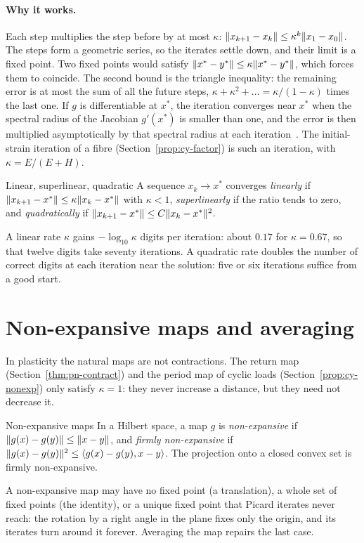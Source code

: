 \paragraph{Why it works.} Each step multiplies the step before by at most $\kappa$:
$\lVert x_{k+1}-x_k\rVert\le\kappa^k\lVert x_1-x_0\rVert$. The steps form a geometric
series, so the iterates settle down, and their limit is a fixed point. Two
fixed points would satisfy $\lVert x^\ast-y^\ast\rVert\le\kappa\lVert x^\ast-y^\ast\rVert$,
which forces them to coincide. The second bound is the triangle inequality:
the remaining error is at most the sum of all the future steps,
$\kappa+\kappa^2+\dots=\kappa/(1-\kappa)$ times the last one.
If $g$ is differentiable at $x^\ast$, the iteration converges near $x^\ast$
when the spectral radius of the Jacobian $g'(x^\ast)$ is smaller than one, and
the error is then multiplied asymptotically by that spectral radius at each
iteration~\cite[Ch.~10]{OrtegaRheinboldt1970}. The initial-strain iteration
of a fibre (Section~\ref{prop:cy-factor}) is such an iteration, with
$\kappa=E/(E+H)$.

\begin{gbox}{Linear, superlinear, quadratic}\label{def:it-order}
%
A sequence $x_k\to x^\ast$ converges \emph{linearly} if
$\lVert x_{k+1}-x^\ast\rVert\le\kappa\lVert x_k-x^\ast\rVert$ with $\kappa<1$,
\emph{superlinearly} if the ratio tends to zero, and \emph{quadratically} if
$\lVert x_{k+1}-x^\ast\rVert\le C\lVert x_k-x^\ast\rVert^2$.
\end{gbox}
A linear rate $\kappa$ gains $-\log_{10}\kappa$ digits per iteration: about
$0.17$ for $\kappa=0.67$, so that twelve digits take seventy iterations. A
quadratic rate doubles the number of correct digits at each iteration near the
solution: five or six iterations suffice from a good start.

\section{Non-expansive maps and averaging}\label{sec:it-nonexp}
%
In plasticity the natural maps are not contractions. The return map
(Section~\ref{thm:pn-contract}) and the period map of cyclic loads
(Section~\ref{prop:cy-nonexp}) only satisfy $\kappa=1$: they never increase a
distance, but they need not decrease it.
\begin{gbox}{Non-expansive maps}\label{def:it-nonexp}
In a Hilbert space, a map $g$ is \emph{non-expansive} if
$\lVert g(x)-g(y)\rVert\le\lVert x-y\rVert$, and \emph{firmly non-expansive} if
$\lVert g(x)-g(y)\rVert^2\le\langle g(x)-g(y),x-y\rangle$. The projection onto a closed convex
set is firmly non-expansive.
\end{gbox}
A non-expansive map may have no fixed point (a translation), a whole set of
fixed points (the identity), or a unique fixed point that Picard iterates never
reach: the rotation by a right angle in the plane fixes only the origin, and
its iterates turn around it forever. Averaging the map repairs the last case.

